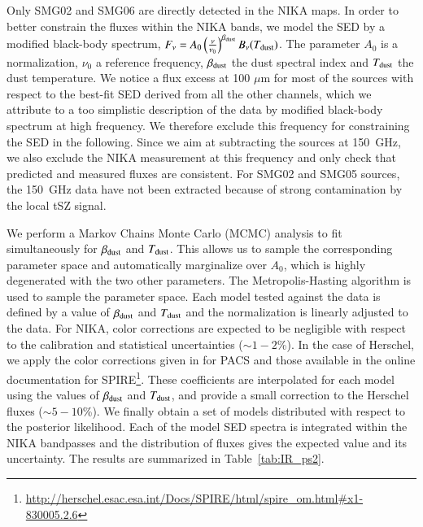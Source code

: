 \documentclass[twocolumn,traditabstract]{aa}
\begin{document}
Only SMG02 and SMG06 are directly detected in the NIKA maps. In order to better constrain the fluxes within the NIKA bands, we model the SED by a modified black-body spectrum, $F_{\nu} = A_0 \left(\frac{\nu}{\nu_0}\right)^{\beta_{\rm dust}} B_{\nu}(T_{\rm dust})$. The parameter $A_0$ is a normalization, $\nu_0$ a reference frequency, $\beta_{\rm dust}$ the dust spectral index and $T_{\rm dust}$ the dust temperature. We notice a flux excess at 100 $\mu$m for most of the sources with respect to the best-fit SED derived from all the other channels, which we attribute to a too simplistic description of the data by modified black-body spectrum at high frequency. We therefore exclude this frequency for constraining the SED in the following. Since we aim at subtracting the sources at 150~GHz, we also exclude the NIKA measurement at this frequency and only check that predicted and measured fluxes are consistent. For SMG02 and SMG05 sources, the 150~GHz data have not been extracted because of strong contamination by the local tSZ signal.

We perform a Markov Chains Monte Carlo (MCMC) analysis to fit simultaneously for $\beta_{\rm dust}$ and $T_{\rm dust}$. This allows us to sample the corresponding parameter space and automatically marginalize over $A_0$, which is highly degenerated with the two other parameters. The Metropolis-Hasting algorithm is used to sample the parameter space. Each model tested against the data is defined by a value of $\beta_{\rm dust}$ and $T_{\rm dust}$ and the normalization is linearly adjusted to the data. For NIKA, color corrections are expected to be negligible with respect to the calibration and statistical uncertainties ($\sim 1-2$\%). In the case of Herschel, we apply the color corrections given in \cite{poglitsch2010} for PACS and those available in the online documentation for SPIRE\footnote{\url{http://herschel.esac.esa.int/Docs/SPIRE/html/spire_om.html\#x1-830005.2.6}}. These coefficients are interpolated for each model using the values of $\beta_{\rm dust}$ and $T_{\rm dust}$, and provide a small correction to the Herschel fluxes ($\sim 5-10$\%). We finally obtain a set of models distributed with respect to the posterior likelihood. Each of the model SED spectra is integrated within the NIKA bandpasses and the distribution of fluxes gives the expected value and its uncertainty. The results are summarized in Table~\ref{tab:IR_ps2}.

\end{document}
